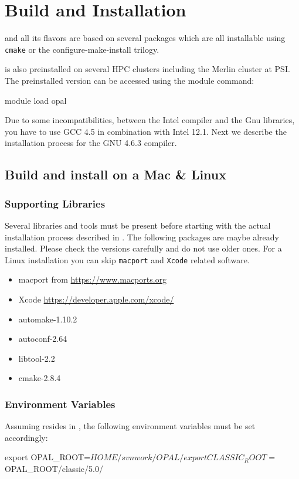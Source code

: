 

\chapter{Build and Installation}
\label{chp:installation}
\opal and all its flavors are based on several packages which are all installable using \texttt{cmake} or the configure-make-install trilogy.

\opal is also preinstalled on several HPC clusters including the Merlin cluster at PSI. The preinstalled version can be accessed
using the module command:
\begin{footnotesize}
\begin{example}
module load opal
\end{example}
\end{footnotesize}
Due to some incompatibilities, between the Intel compiler and the Gnu libraries, you have to use GCC 4.5 in combination with Intel 12.1. Next we describe
the installation process for the GNU 4.6.3 compiler.
\section{Build and install \opal on a Mac \& Linux}
\subsection{Supporting Libraries}
Several libraries and tools must be present before starting with the actual \opal installation process described in .
The following packages are maybe already installed. Please check the versions carefully and do not use older ones. For a Linux installation
you can skip \texttt{macport} and \texttt{Xcode} related software.
\begin{itemize}
\item macport from \url{https://www.macports.org}
\item Xcode \url{https://developer.apple.com/xcode/}
\item automake-1.10.2
\item autoconf-2.64
\item libtool-2.2
\item cmake-2.8.4
\end {itemize}


\subsection{Environment Variables}
\label{ssec:envvar}
Assuming \opal resides in , the following
environment variables must be set accordingly:
\begin{footnotesize}
\begin{example}
export OPAL_ROOT=$HOME/svnwork/OPAL/
export CLASSIC_ROOT=$OPAL_ROOT/classic/5.0/
\end{example}
\end{footnotesize}


